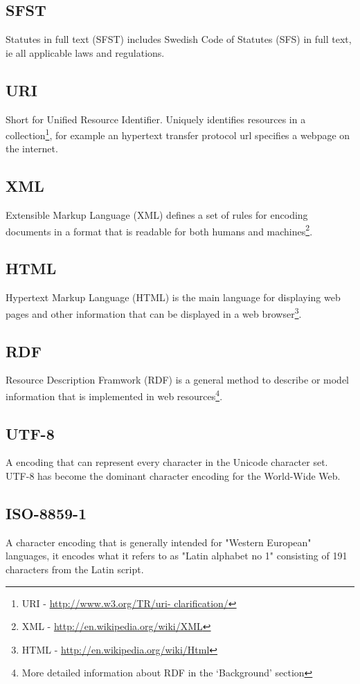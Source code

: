 \documentclass[a4paper,11pt]{kth-mag}
\begin{document}
\subsection*{SFST}
Statutes in full text (SFST) includes Swedish Code of Statutes (SFS) in
full text, ie all applicable laws and regulations.

\subsection*{URI} Short for Unified Resource Identifier. Uniquely identifies
resources in a collection\footnote{URI - \url{http://www.w3.org/TR/uri-
clarification/}}, for example an hypertext transfer protocol url specifies a
webpage on the internet.

\subsection*{XML} Extensible Markup Language (XML) defines a set of rules for
encoding documents in a format that is readable for both humans and
machines\footnote{XML - \url{http://en.wikipedia.org/wiki/XML}}.

\subsection*{HTML} Hypertext Markup Language (HTML) is the main language for
displaying web pages and other information that can be displayed in a web
browser\footnote{HTML - \url{http://en.wikipedia.org/wiki/Html}}.

\subsection*{RDF} Resource Description Framwork (RDF) is a general method to
describe or model information that is implemented in web
resources\footnote{More detailed information about RDF in the ‘Background’
section}.

\subsection*{UTF-8} A encoding that can represent every character in the
Unicode character set. UTF-8 has become the dominant character encoding for
the World-Wide Web.

\subsection*{ISO-8859-1} A character encoding that is generally intended for
"Western European" languages, it encodes what it refers to as "Latin alphabet
no 1" consisting of 191 characters from the Latin script.
\end{document}
